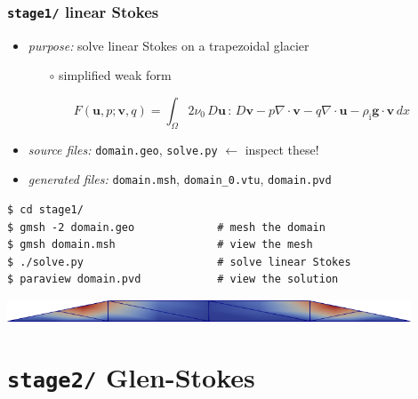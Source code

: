 \documentclass[10pt,hyperref,dvipsnames]{beamer}
\newcommand{\bv}{\mathbf{v}}
\newcommand{\bu}{\mathbf{u}}
\newcommand{\rhoi}{\rho_{\text{i}}}
\begin{document}
\begin{frame}[fragile]
\frametitle{\texttt{stage1/} \qquad linear Stokes}

\begin{itemize}
\item \emph{purpose:} solve linear Stokes on a trapezoidal glacier

    \begin{itemize}
    \item[$\circ$] simplified weak form
    \end{itemize}
{\small
    $$F(\bu,p;\bv,q) = \int_{\Omega} 2 \nu_0\, D\bu\,:\,D\bv - p \nabla \cdot \bv - q \nabla \cdot \bu - \rhoi \mathbf{g} \cdot \bv \,dx$$
}
\item \emph{source files:} \texttt{domain.geo}, \texttt{solve.py} \hfill \alert{$\gets$ inspect these!}
\item \emph{generated files:} \texttt{domain.msh}, \texttt{domain\_0.vtu}, \texttt{domain.pvd}
\end{itemize}

\bigskip
\begin{Verbatim}
$ cd stage1/
$ gmsh -2 domain.geo             # mesh the domain
$ gmsh domain.msh                # view the mesh
$ ./solve.py                     # solve linear Stokes
$ paraview domain.pvd            # view the solution
\end{Verbatim}

\vspace{5mm}
\begin{center}
\includegraphics[width=0.9\textwidth]{figs/stage1.png}
\end{center}
\end{frame}


\section{\texttt{stage2/} \qquad Glen-Stokes}
\end{document}
